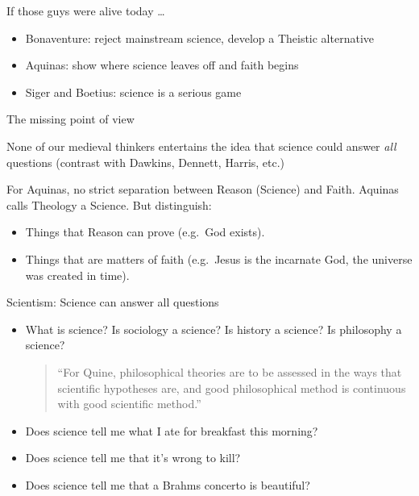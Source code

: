 \documentclass{beamer}
\begin{document}
\begin{frame}{If those guys were alive today \dots }

\begin{itemize}
\item Bonaventure: reject mainstream science, develop a Theistic
  alternative
\item Aquinas: show where science leaves off and faith begins
\item Siger and Boetius: science is a serious game
\end{itemize}

\end{frame}

\begin{frame}{The missing point of view}

  None of our medieval thinkers entertains the idea that science could
  answer \emph{all} questions (contrast with Dawkins, Dennett, Harris,
  etc.)

  \bigskip For Aquinas, no strict separation between Reason (Science)
  and Faith.  Aquinas calls Theology a Science.  But distinguish:
\begin{itemize}
\item Things that Reason can prove (e.g.\ God exists).
\item Things that are matters of faith (e.g.\ Jesus is the incarnate
  God, the universe was created in time). \end{itemize}

\end{frame}


\begin{frame}{Scientism: Science can answer all questions}

\begin{itemize}
\item What is science?  Is sociology a science?  Is history a science?
  Is philosophy a science?
  \begin{quote} ``For Quine, philosophical theories are to be assessed
    in the ways that scientific hypotheses are, and good philosophical
    method is continuous with good scientific method.''
\end{quote}
\item Does science tell me what I ate for breakfast this morning?
\item Does science tell me that it's wrong to kill?
\item Does science tell me that a Brahms concerto is beautiful?
\end{itemize}


\end{frame}
\end{document}
